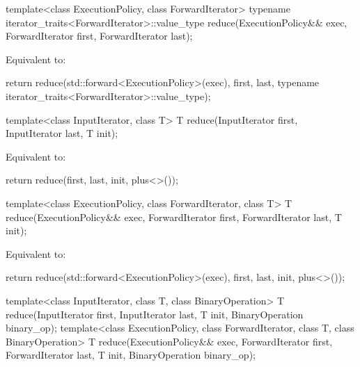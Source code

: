 %
\begin{itemdecl}
template<class ExecutionPolicy, class ForwardIterator>
  typename iterator_traits<ForwardIterator>::value_type
    reduce(ExecutionPolicy&& exec,
           ForwardIterator first, ForwardIterator last);
\end{itemdecl}

\begin{itemdescr}
\pnum
\effects
Equivalent to:
\begin{codeblock}
return reduce(std::forward<ExecutionPolicy>(exec), first, last,
              typename iterator_traits<ForwardIterator>::value_type{});
\end{codeblock}
\end{itemdescr}


%
\begin{itemdecl}
template<class InputIterator, class T>
  T reduce(InputIterator first, InputIterator last, T init);
\end{itemdecl}

\begin{itemdescr}
\pnum
\effects
Equivalent to:
\begin{codeblock}
return reduce(first, last, init, plus<>());
\end{codeblock}
\end{itemdescr}

%
\begin{itemdecl}
template<class ExecutionPolicy, class ForwardIterator, class T>
  T reduce(ExecutionPolicy&& exec,
           ForwardIterator first, ForwardIterator last, T init);
\end{itemdecl}

\begin{itemdescr}
\pnum
\effects
Equivalent to:
\begin{codeblock}
return reduce(std::forward<ExecutionPolicy>(exec), first, last, init, plus<>());
\end{codeblock}
\end{itemdescr}


%
\begin{itemdecl}
template<class InputIterator, class T, class BinaryOperation>
  T reduce(InputIterator first, InputIterator last, T init,
           BinaryOperation binary_op);
template<class ExecutionPolicy, class ForwardIterator, class T, class BinaryOperation>
  T reduce(ExecutionPolicy&& exec,
           ForwardIterator first, ForwardIterator last, T init,
           BinaryOperation binary_op);
\end{itemdecl}

